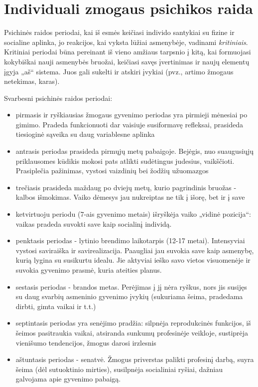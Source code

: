 \section{Individuali zmogaus psichikos raida}

\label{tema:psichikos_raida}

Psichinės raidos periodai, kai iš esmės keičiasi individo santykiai
su fizine ir socialine aplinka, jo reakcijos, kai vyksta lūžiai asmenybėje,
vadinami \emph{kritiniais}. Kritiniai periodai būna pereinant iš vieno 
amžiaus tarpsnio į kitą, kai formuojasi kokybiškai nauji asmenybės 
bruožai, keičiasi savęs įvertinimas ir naujų elementų įgyja „aš“ sistema.
Juos gali sukelti ir atskiri įvykiai (pvz., artimo žmogaus netekimas, karas).


Svarbesni psichinės raidos periodai:
\begin{itemize}
  \item pirmasis ir ryškiausias žmogaus gyvenimo periodas yra pirmieji 
  mėnesiai po gimimo. Pradeda funkcionuoti dar vaisiuje susiformavę 
  refleksai, prasideda tiesioginė sąveika su daug variablesne aplinka
  \item antrasis periodas prasideda pirmųjų metų pabaigoje. Bejėgis, nuo
  suaugusiųjų priklausomes kūdikis mokosi pats atlikti sudėtingus judesius,
  vaikščioti. Prasiplečia pažinimas, vystosi vaizdinių bei žodžių užuomazgos
  \item trečiasis prasideda maždaug po dviejų metų, kurio pagrindinis 
  bruožas - kalbos išmokimas. Vaiko dėmesys jau nukreiptas ne tik į išorę,
  bet ir į save
  \item ketvirtuoju periodu (7-ais gyvenimo metais) išryškėja vaiko „vidinė
  pozicija“: vaikas pradeda suvokti save kaip socialinį individą.
  \item penktasis periodas - lytinio brendimo laikotarpis (12-17 metai).
  Intensyviai vystosi saviraiška ir savirealizacija. Paaugliai jau suvokia 
  save kaip asmenybę, kurią lygina su susikurtu idealu. Jie aktyviai
  ieško savo vietos visuomenėje ir suvokia gyvenimo prasmė, kuria ateities
  planus.
  \item sestasis periodas - brandos metas. Perėjimas į jį nėra ryškus, nors 
  jis susijęs su daug svarbių asmeninio gyvenimo įvykių (sukuriama šeima,
  pradedama dirbti, gimta vaikai ir t.t.)
  \item septintasis periodas yra senėjimo pradžia: silpnėja reprodukcinės 
  funkcijos, iš šeimos pasitraukia vaikai, atsiranda sunkumų profesinėje 
  veikloje, sustiprėja vienišumo tendencijos, žmogus darosi irzlesnis
  \item aštuntasis periodas - senatvė. Žmogus priverstas palikti profesinį
  darbą, suyra šeima (dėl sutuoktinio mirties), susilpnėja socialiniai ryšiai,
  dažniau galvojama apie gyvenimo pabaigą.
\end{itemize}

